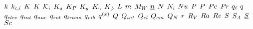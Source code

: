\begin{mdframed}
$\thermcond$ \newline
$\masstranscoeff$ \newline
$\dilfac$ \newline
$\taylordisp$ \newline
$\partcoeff$ \newline
$\eqconst$ \newline
$\peqconst$ \newline
$\yeqconst$ \newline
$\acteqconst$ \newline
$\fugeqconst$ \newline
$\length$ \newline
$\mass$ \newline
$\mw$ \newline
$\normvec$ \newline
$\nummoles$ \newline
$\massspecflux$ \newline
$\nusselt$ \newline
$\p$ \newline
$\prob$ \newline
$\peclet$ \newline
$\prandtl$ \newline
$\charge$ \newline
$\heatflux$ \newline
$\empc$ \newline
$\impc$ \newline
$\nmpc$ \newline
$\rmpc$ \newline
$\tmpc$ \newline
$\vmpc$ \newline
$\dufour$ \newline
$\heatflow$ \newline
$\ipc$ \newline
$\cpc$ \newline
$\cmpc$ \newline
$\cpf$ \newline
$\pos$ \newline
$\specsource$ \newline
$\rayleigh$ \newline
$\reynolds$ \newline
$\entropy$ \newline
$\sa$ \newline
$\stressvec$ \newline
$\schmidt$ \newline

\end{mdframed}
